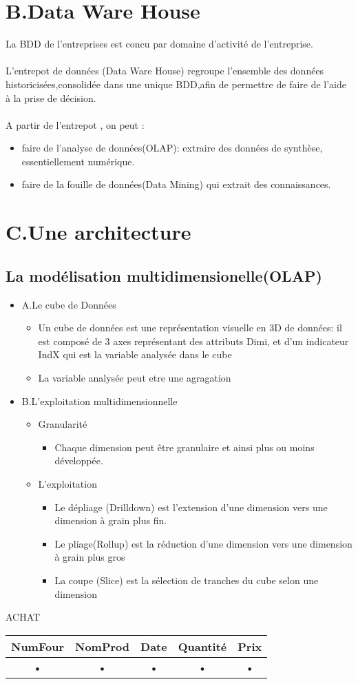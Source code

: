 \documentclass[10pt,a4paper]{report}
\begin{document}
\chapter{B.Data Ware House}
La BDD de l'entreprises est concu par domaine d'activité de l'entreprise.\\\\
L'entrepot de données (Data Ware House) regroupe l'ensemble des données historicisées,consolidée dans une unique BDD,afin de permettre de faire de l'aide à la prise de décision.\\\\


A partir de l'entrepot , on peut :
\begin{itemize}
\item faire de l'analyse de données(OLAP): extraire des données de synthèse, essentiellement numérique.
\item faire de la fouille de données(Data Mining) qui extrait des connaissances.
\end{itemize}

\chapter{C.Une architecture}

\section*{La modélisation multidimensionelle(OLAP)}
\begin{itemize}
\item A.Le cube de Données
\begin{itemize}
\item Un cube de données est une représentation visuelle en 3D de données: il est composé de 3 axes représentant des attributs Dimi, et d'un indicateur IndX qui est la variable analysée dans le cube
\item La variable analysée peut etre une agragation
\end{itemize}
\item B.L'exploitation multidimensionnelle
\begin{itemize}
\item Granularité
\begin{itemize}
\item  Chaque dimension peut être granulaire et ainsi plus ou moins développée.
\end{itemize}
\item L'exploitation
\begin{itemize}
\item Le dépliage (Drilldown) est l'extension d'une dimension vers une dimension à grain plus fin.
\item Le pliage(Rollup) est la réduction d'une dimension vers une dimension à grain plus gros
\item La coupe (Slice) est la sélection de tranches du cube selon une dimension
\end{itemize}
\end{itemize}
\end{itemize}

ACHAT
\begin{tabular}{|c|c|c|c|c|}
\hline 
NumFour & NomProd & Date & Quantité & Prix \\ 
\hline 
• & • & • & • & • \\ 
\hline 
\end{tabular} 
\end{document}
